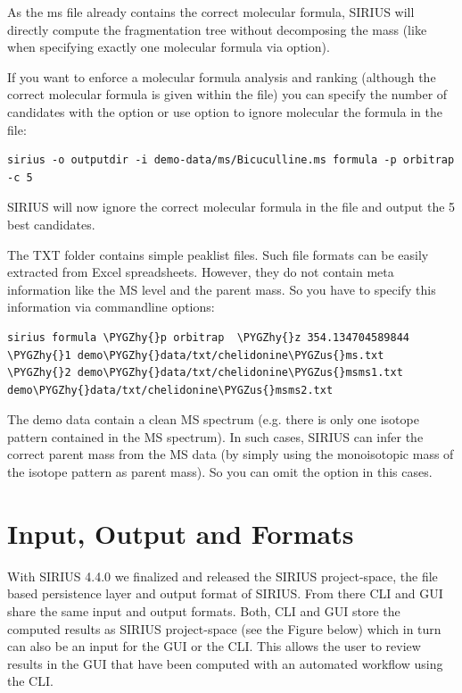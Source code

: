 \documentclass[letterpaper,10pt,openany,oneside]{sphinxmanual}
\def\PYGZus{\char`\_}
\def\PYGZhy{\char`\-}
\begin{document}
As the ms file already contains the correct molecular formula, SIRIUS will
directly compute the fragmentation tree without decomposing the mass (like when specifying exactly one molecular formula via  option).

If you want to enforce a molecular formula analysis and ranking (although the correct molecular formula is given within the file) you can specify the number of candidates with the  option or use  option to ignore molecular the formula in the file: 

\begin{Verbatim}[commandchars=\\\{\}]
sirius -o outputdir -i demo-data/ms/Bicuculline.ms formula -p orbitrap -c 5
\end{Verbatim}

SIRIUS will now ignore the correct molecular formula in the file and output the 5 best candidates.

The TXT folder contains simple peaklist files. Such file formats can be easily extracted from Excel spreadsheets. However, they do not contain meta information like the MS level and the parent mass. So you have to specify this information via commandline options:

\begin{Verbatim}[commandchars=\\\{\}]
sirius formula \PYGZhy{}p orbitrap  \PYGZhy{}z 354.134704589844 \PYGZhy{}1 demo\PYGZhy{}data/txt/chelidonine\PYGZus{}ms.txt
\PYGZhy{}2 demo\PYGZhy{}data/txt/chelidonine\PYGZus{}msms1.txt demo\PYGZhy{}data/txt/chelidonine\PYGZus{}msms2.txt
\end{Verbatim}

The demo data contain a clean MS spectrum (e.g. there is only one isotope pattern contained in the MS spectrum). In such cases, SIRIUS can infer the correct parent mass from the MS data (by simply using the monoisotopic mass of the isotope pattern as parent mass). So you can omit the  option in this cases.






\chapter{Input, Output and Formats}
With SIRIUS 4.4.0 we finalized and released the SIRIUS project-space, the file based persistence layer and output format of SIRIUS. 
From there CLI and GUI share the same input and output formats. 
Both, CLI and GUI store the computed results as SIRIUS project-space (see the Figure below) which in turn can also be an input for the GUI or the CLI. 
This allows the user to review results in the GUI that have been computed with an automated workflow using the CLI. 
\end{document}
